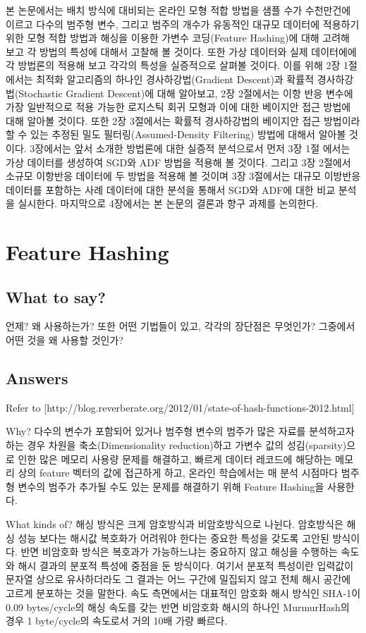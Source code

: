 \documentclass[oneside,b5paper,11pt]{article} %
\begin{document}
본 논문에서는 배치 방식에 대비되는 온라인 모형 적합 방법을 샘플 수가 수천만건에 이르고 다수의 범주형 변수, 그리고 범주의 개수가 유동적인 대규모 데이터에 적용하기 위한 모형 적합 방법과 해싱을 이용한 가변수 코딩(Feature Hashing)에 대해 고려해 보고 각 방법의 특성에 대해서 고찰해 볼 것이다. 또한 가상 데이터와 실제 데이터에에 각 방법론의 적용해 보고 각각의 특성을 실증적으로 살펴볼 것이다. 이를 위해 2장 1절에서는 최적화 알고리즘의 하나인 경사하강법(Gradient Descent)과 확률적 경사하강법(Stochastic Gradient Descent)에 대해 알아보고, 2장 2절에서는 이항 반응 변수에 가장 일반적으로 적용 가능한 로지스틱 회귀 모형과 이에 대한 베이지안 접근 방법에 대해 알아볼 것이다. 또한 2장 3절에서는 확률적 경사하강법의 베이지안 접근 방법이라 할 수 있는 추정된 밀도 필터링(Assumed-Density Filtering) 방법에 대해서 알아볼 것이다. 3장에서는 앞서 소개한 방법론에 대한 실증적 분석으로서 먼저 3장 1절 에서는 가상 데이터를 생성하여 SGD와 ADF 방법을 적용해 볼 것이다. 그리고 3장 2절에서 소규모 이항반응 데이터에 두 방법을 적용해 볼 것이며 3장 3절에서는 대규모 이방반응 데이터를 포함하는 사례 데이터에 대한 분석을 통해서 SGD와 ADF에 대한 비교 분석을 실시한다. 마지막으로 4장에서는 본 논문의 결론과 향구 과제를 논의한다.



\section{Feature Hashing}
\subsection{What to say?}
 언제? 왜 사용하는가? 또한 어떤 기법들이 있고, 각각의 장단점은 무엇인가? 그중에서 어떤 것을 왜 사용할 것인가?
\subsection{Answers}
Refer to [http://blog.reverberate.org/2012/01/state-of-hash-functions-2012.html]

Why?
 다수의 변수가 포함되어 있거나 범주형 변수의 범주가 많은 자료를 분석하고자 하는 경우 차원을 축소(Dimensionality reduction)하고 가변수 값의 성김(sparsity)으로 인한 많은 메모리 사용량 문제를 해결하고, 빠르게 데이터 레코드에 해당하는 메모리 상의 feature 벡터의 값에 접근하게 하고, 온라인 학습에서는 매 분석 시점마다 범주형 변수의 범주가 추가될 수도 있는 문제를 해결하기 위해 Feature Hashing을 사용한다.

What kinds of?
 해싱 방식은 크게 암호방식과 비암호방식으로 나뉜다. 암호방식은 해싱 성능 보다는 해시값 복호화가 어려워야 한다는 중요한 특성을 갖도록 고안된 방식이다. 반면 비암호화 방식은 복호과가 가능하느냐는 중요하지 않고 해싱을 수행하는 속도와 해시 결과의 분포적 특성에 중점을 둔 방식이다. 여기서 분포적 특성이란 입력값이 문자열 상으로 유사하더라도 그 결과는 어느 구간에 밀집되지 않고 전체 해시 공간에 고르게 분포하는 것을 말한다.\citep{Ramadhian2013} 속도 측면에서는 대표적인 암호화 해시 방식인 SHA-1이 0.09 bytes/cycle의 해싱 속도를 갖는 반면 비암호화 해시의 하나인 MurmurHash의 경우 1 byte/cycle의 속도로서 거의 10배 가량 빠르다. 
\end{document}
